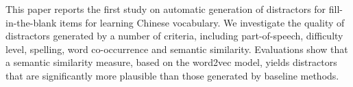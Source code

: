 This paper reports the first study on automatic generation of distractors for fill-in-the-blank items for learning Chinese vocabulary.  We investigate the quality of distractors generated by a number of criteria, including part-of-speech, difficulty level, spelling, word co-occurrence and semantic similarity.  Evaluations show that a semantic similarity measure, based on the word2vec model, yields distractors that are significantly more plausible than those generated by baseline methods.
